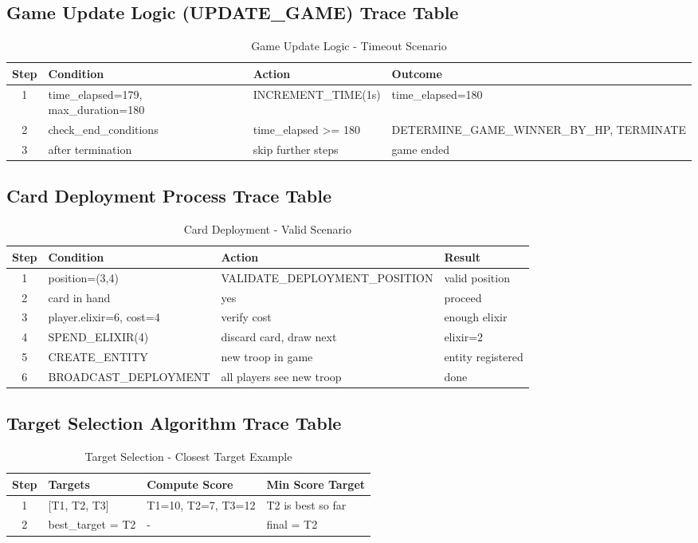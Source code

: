 \documentclass{article}
\begin{document}
\subsection{Game Update Logic (UPDATE\_GAME) Trace Table}
\begin{table}[H]
\centering
\footnotesize
\begin{tabular}{|c|p{3cm}|p{5cm}|p{3cm}|}
\hline
\textbf{Step} & \textbf{Condition} & \textbf{Action} & \textbf{Outcome}\\
\hline
1 & time\_elapsed=179, max\_duration=180 & INCREMENT\_TIME(1s) & time\_elapsed=180 \\
\hline
2 & check\_end\_conditions & time\_elapsed >= 180 & DETERMINE\_GAME\_WINNER\_BY\_HP, TERMINATE \\
\hline
3 & after termination & skip further steps & game ended \\
\hline
\end{tabular}
\caption{Game Update Logic - Timeout Scenario}
\end{table}

\subsection{Card Deployment Process Trace Table}
\begin{table}[H]
\centering
\footnotesize
\begin{tabular}{|c|p{3.5cm}|p{4cm}|p{3cm}|}
\hline
\textbf{Step} & \textbf{Condition} & \textbf{Action} & \textbf{Result}\\
\hline
1 & position=(3,4) & VALIDATE\_DEPLOYMENT\_POSITION & valid position \\
\hline
2 & card in hand & yes & proceed \\
\hline
3 & player.elixir=6, cost=4 & verify cost & enough elixir \\
\hline
4 & SPEND\_ELIXIR(4) & discard card, draw next & elixir=2 \\
\hline
5 & CREATE\_ENTITY & new troop in game & entity registered \\
\hline
6 & BROADCAST\_DEPLOYMENT & all players see new troop & done \\
\hline
\end{tabular}
\caption{Card Deployment - Valid Scenario}
\end{table}

\subsection{Target Selection Algorithm Trace Table}
\begin{table}[H]
\centering
\footnotesize
\begin{tabular}{|c|p{3.5cm}|p{4cm}|p{3.5cm}|}
\hline
\textbf{Step} & \textbf{Targets} & \textbf{Compute Score} & \textbf{Min Score Target}\\
\hline
1 & [T1, T2, T3] & T1=10, T2=7, T3=12 & T2 is best so far \\
\hline
2 & best\_target = T2 & - & final = T2 \\
\hline
\end{tabular}
\caption{Target Selection - Closest Target Example}
\end{table}
\end{document}

